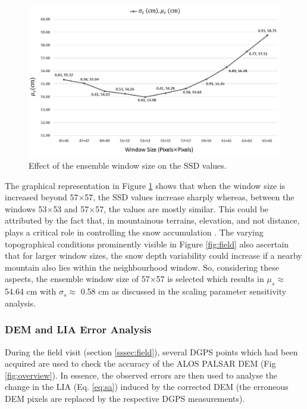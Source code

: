 \documentclass[12pt]{elsarticle}
\numberwithin{equation}{section}
\numberwithin{figure}{section}
\numberwithin{table}{section}
\begin{document}
\begin{figure}[htb]
    \centering
    \includegraphics[width=\textwidth]{Figures/Results/SSD_Res.png}
    \caption{Effect of the ensemble window size on the SSD values.}
    \label{fig:swindow}
\end{figure}

The graphical representation in Figure \ref{fig:swindow} shows that when the window size is increased beyond 57$\times$57, the SSD values increase sharply whereas, between the windows 53$\times$53 and 57$\times$57, the values are mostly similar. This could be attributed by the fact that, in mountainous terrains, elevation, and not distance, plays a critical role in controlling the snow accumulation \citep{Liu2017, Singh2014, Singh2017, Thakur2012}. The varying topographical conditions prominently visible in Figure \ref{fig:field} also ascertain that for larger window sizes, the snow depth variability could increase if a nearby mountain also lies within the neighbourhood window. So, considering these aspects, the ensemble window size of 57$\times$57 is selected which results in $\mu_s \approx$ 54.64 cm with $\sigma_s \approx$ 0.58 cm as discussed in the scaling parameter sensitivity analysis.

\subsubsection{DEM and LIA Error Analysis}
\label{sssec:error}

During the field visit (section \ref{sssec:field}), several DGPS points which had been acquired are used to check the
accuracy of the ALOS PALSAR DEM (Fig \ref{fig:overview}). In essence, the observed errors are then used to analyse the change in the LIA (Eq. \eqref{eq:sa}) induced by the corrected DEM (the erroneous DEM pixels are replaced by the respective DGPS measurements). 
\end{document}
